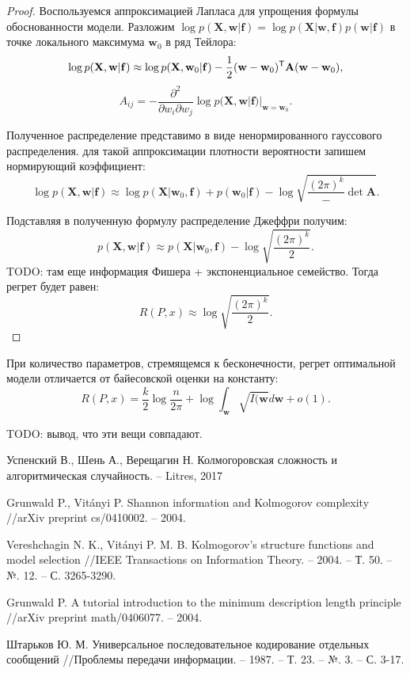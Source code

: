 \documentclass[../main.tex]{subfiles}
\begin{document}
\begin{proof}
Воспользуемся аппроксимацией Лапласа для упрощения формулы обоснованности модели.
Разложим $\log p(\mathbf{X}, \mathbf{w}|\mathbf{f}) = \log p(\mathbf{X}|\mathbf{w},\mathbf{f})p(\mathbf{w}|\mathbf{f})$ в точке локального максимума $\mathbf{w}_0$ в ряд Тейлора:
\[
    \log p(\mathbf{X}, \mathbf{w}|\mathbf{f}) \approx \log p(\mathbf{X}, \mathbf{w}_0|\mathbf{f})  - \frac{1}{2} (\mathbf{w}-\mathbf{w}_0)^{\mathsf{T}} \mathbf{A} (\mathbf{w}-\mathbf{w}_0),
\]
\[
    A_{ij} = -\frac{\partial^2}{\partial w_i \partial w_j}\log p(\mathbf{X}, \mathbf{w}|\mathbf{f})|_{\mathbf{w} = \mathbf{w}_0}.
\]

Полученное распределение представимо в виде ненормированного гауссового распределения. для такой аппроксимации плотности вероятности запишем нормирующий коэффициент: 
\[
    \log p(\mathbf{X}, \mathbf{w}|\mathbf{f}) \approx \log p(\mathbf{X}|\mathbf{w}_0, \mathbf{f}) + p(\mathbf{w}_0|\mathbf{f}) - \log \sqrt{\frac{(2\pi)^k} - {\det \mathbf{A}}}.
\]

Подставляя в полученную формулу распределение Джеффри получим:
\[
    p(\mathbf{X}, \mathbf{w}|\mathbf{f}) \approx p(\mathbf{X}|\mathbf{w}_0, \mathbf{f}) - \log\sqrt{\frac{(2\pi)^k}{2}}.
\]
TODO: там еще информация Фишера + экспоненциальное семейство.
Тогда регрет будет равен:
\[
    R(P, x) \approx  \log\sqrt{\frac{(2\pi)^k}{2}}.
\]
\end{proof}

\begin{theorembd}
При количество параметров, стремящемся к бесконечности, регрет оптимальной модели отличается от байесовской оценки на константу:
\[
R(P, x) = \frac{k}{2} \log \frac{n}{2\pi} + \log{\int_{\mathbf{w}}} \sqrt{I(\mathbf{w}} d\mathbf{w} + o(1).
\]
\end{theorembd}

TODO: вывод, что эти вещи совпадают.
\begin{thebibliography}{99}
	Успенский В., Шень А., Верещагин Н. Колмогоровская сложность и алгоритмическая случайность. – Litres, 2017

Grunwald P., Vitányi P. Shannon information and Kolmogorov complexity //arXiv preprint cs/0410002. – 2004.

Vereshchagin N. K., Vitányi P. M. B. Kolmogorov's structure functions and model selection //IEEE Transactions on Information Theory. – 2004. – Т. 50. – №. 12. – С. 3265-3290.

Grunwald P. A tutorial introduction to the minimum description length principle //arXiv preprint math/0406077. – 2004.

Штарьков Ю. М. Универсальное последовательное кодирование отдельных сообщений //Проблемы передачи информации. – 1987. – Т. 23. – №. 3. – С. 3-17.
\end{thebibliography}
\end{document}
